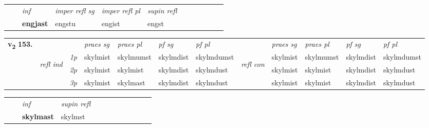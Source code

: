 \begin{tabular}{llllllllllll}
 & & \textit{inf}   & \textit{imper refl sg} & \textit{imper refl pl}   & \textit{supin refl}      \\*
  & & \textbf{engjast}    & engstu & engist   & engst  \\*
\cmidrule{1-12}
\end{tabular}



\begin{tabular}{llllllllllll} \toprule
\multirow{4}{*}{{{\textbf{v{\textsubscript{2}}} \Large{\textbf{153.}}}}}  & &   &  \textit{praes sg}  & \textit{praes pl}  &\textit{pf sg} & \textit{pf pl} &  &  \textit{praes sg}  & \textit{praes pl}  & \textit{pf sg} & \textit{pf pl } \\*
	\cmidrule{4-7} \cmidrule{9-12}
 &\multirow{3}{*}{\begin{turn}{90}\textit{refl ind}\end{turn}} & {\textit{1p}} & skylmist & skylmumst    & skylmdist & skylmdumst & \multirow{3}{*}{\begin{turn}{90}\textit{refl con}\end{turn}}  &skylmist & skylmumst & skylmdist & skylmdumst\\*
 &&  {\textit{2p}} &  skylmist  & skylmist   & skylmdist & skylmdust & &skylmist & skylmist & skylmdist & skylmdust \\*
& &  {\textit{3p}} & skylmist & skylmast   & skylmdist & skylmdust & & skylmist & skylmist& skylmdist & skylmdust  \\*
\cmidrule{4-7} \cmidrule{9-12}
\end{tabular}


\begin{tabular}{llllllllllll}
 & & \textit{inf}       & \textit{supin refl}      \\*
  & & \textbf{skylmast}        & skylmst  \\*
\cmidrule{1-12}
\end{tabular}



